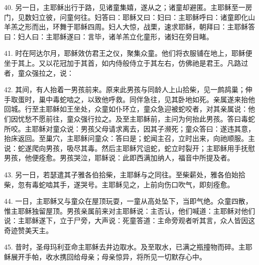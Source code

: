40. 另一日，主耶稣出行于路，见诸童集嬉，遂从之；诸童却避匿。主耶稣至一房门，见数妇立彼，问童何往。妇答曰：耶稣又曰：妇曰：主耶稣呼曰：诸童即化山羊羔之形而出，环舞于耶稣四周。妇人大惊，战栗，速求耶稣，朝拜曰：主耶稣答曰：妇人曰：主耶稣遂曰：言毕，诸羊羔立化童形，诸妇在旁目睹。\par

41. 时在阿达尔月，耶稣效仿君王之仪，聚集众童。他们将衣服铺在地上，耶稣便坐于其上。又以花冠加于其首，如内侍般侍立于其左右，仿佛祂是君王。凡路过者，童众强拉之，说：\par

42. 其间，有人抬着一男孩前来。原来此男孩与同龄人上山拾柴，见一鹧鸪巢；伸手取蛋时，巢中毒蛇啮之，以致他呼救。同伴急往，见其卧地如死。亲属遂来抬他回城。行至主耶稣如王坐处，众童如仆环立，童众急迎被蛇咬者，对其亲属说：他们因忧愁不愿前往，童众强行拉之。及至主耶稣前，主问为何抬此男孩。答曰毒蛇所咬。主耶稣对童众说：男孩父母请求离去，因其子濒死；童众答曰：遂违其意，抬床返回。至巢穴，主耶稣问童众：答曰是；蛇闻主召，立时出来，向祂顺服。主说：蛇遂爬向男孩，吸尽其毒。然后主耶稣咒诅蛇，蛇立时裂开；主耶稣用手抚慰男孩，他便痊愈。男孩哭泣，耶稣说：此即西满加纳人，福音中所提及者。\par

43. 另一日，若瑟遣其子雅各伯拾柴，主耶稣与之同往。至柴薪处，雅各伯始拾柴，忽有毒蛇啮其手，遂哭号。主耶稣见之，上前向伤口吹气，即刻痊愈。\par

44. 一日，主耶稣又与童众在屋顶玩耍，一童从高处坠下，当即气绝。众童四散，惟主耶稣独留屋顶。男孩亲属前来对主耶稣说：主否认，他们喊道：主耶稣对他们说：主耶稣遂下，立于尸旁，大声说：死童答道：主命旁观者听其言，众人皆因这奇迹赞美天主。\par

45. 昔时，圣母玛利亚命主耶稣去井边取水。及至取水，已满之瓶撞物而碎。主耶稣展开手帕，收水携回给母亲；母亲惊异，将所见一切默存心中。\par

